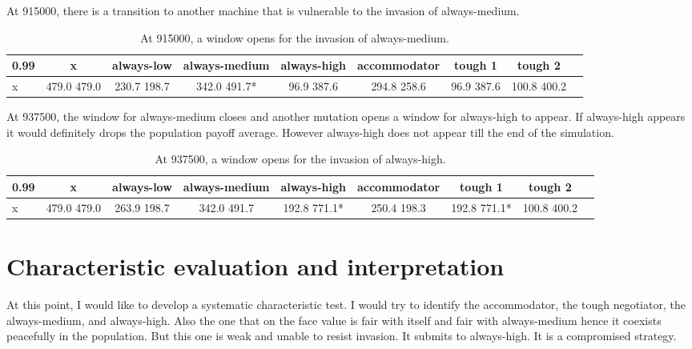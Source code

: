 \documentclass[12.5pt]{report}
\begin{document}
At 915000, there is a transition to another machine that is vulnerable to the invasion of always-medium.
\begin{table}[h!]
\center
\begin{tabular}{l|cccccccc}
\textbf{0.99}& x & always-low & always-medium & always-high & accommodator &tough 1 & tough 2\\
\hline
x& 479.0 479.0 & 230.7 198.7 & 342.0 491.7*  &96.9 387.6&  294.8 258.6&   96.9 387.6&  100.8 400.2\\ 
\end{tabular}
\caption{At 915000, a window opens for the invasion of always-medium.}
\end{table}
At 937500, the window for always-medium closes and another mutation opens a window for always-high to appear. If always-high appears it would definitely drops the population payoff average. However always-high does not appear till the end of the simulation.
\begin{table}[h!]
\center
\begin{tabular}{l|cccccccc}
\textbf{0.99}& x & always-low & always-medium & always-high & accommodator &tough 1 & tough 2\\
\hline
x& 479.0 479.0&  263.9 198.7&  342.0 491.7&  192.8 771.1*& 250.4 198.3 & 192.8 771.1*& 100.8 400.2 \\
\end{tabular}
\caption{At 937500, a window opens for the invasion of always-high.}
\end{table}

\section{Characteristic evaluation and interpretation}

At this point, I would like to develop a systematic characteristic test. I would try to identify the accommodator, the tough negotiator, the always-medium, and always-high. Also the one that on the face value is fair with itself and fair with always-medium hence it coexists peacefully in the population. But this one is weak and unable to resist invasion. It submits to always-high. It is a compromised strategy.\\
\end{document}
